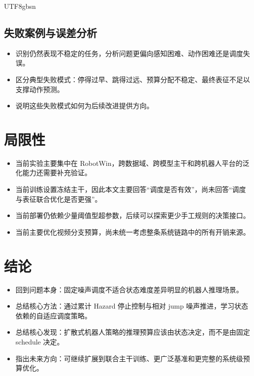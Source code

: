 \documentclass{article}
\begin{document}
\begin{CJK*}{UTF8}{gbsn}
\subsection{失败案例与误差分析}

\begin{itemize}
  \item 识别仍然表现不稳定的任务，分析问题更偏向感知困难、动作困难还是调度失误。
  \item 区分典型失败模式：停得过早、跳得过远、预算分配不稳定、最终表征不足以支撑动作预测。
  \item 说明这些失败模式如何为后续改进提供方向。
\end{itemize}

\section{局限性}

\begin{itemize}
  \item 当前实验主要集中在 RobotWin，跨数据域、跨模型主干和跨机器人平台的泛化能力还需要补充验证。
  \item 当前训练设置冻结主干，因此本文主要回答“调度是否有效”，尚未回答“调度与表征联合优化是否更强”。
  \item 当前部署仍依赖少量阈值型超参数，后续可以探索更少手工规则的决策接口。
  \item 当前主要优化视频分支预算，尚未统一考虑整条系统链路中的所有开销来源。
\end{itemize}

\section{结论}

\begin{itemize}
  \item 回到问题本身：固定噪声调度不适合状态难度差异明显的机器人推理场景。
  \item 总结核心方法：通过累计 Hazard 停止控制与相对 jump 噪声推进，学习状态依赖的自适应调度策略。
  \item 总结核心发现：扩散式机器人策略的推理预算应该由状态决定，而不是由固定 schedule 决定。
  \item 指出未来方向：可继续扩展到联合主干训练、更广泛基准和更完整的系统级预算优化。
\end{itemize}



\end{CJK*}
\end{document}
